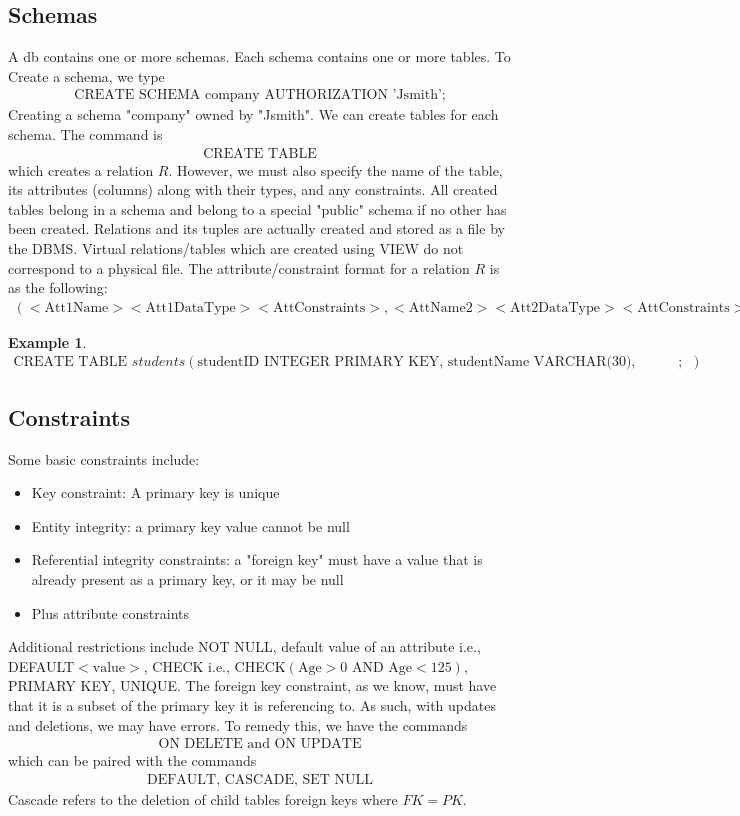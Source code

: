 \documentclass[a4paper]{article}
\theoremstyle{plain}
\theoremstyle{definition}
\newtheorem{exmp}{Example}[section]
\theoremstyle{remark}
\begin{document}
	\subsection{Schemas}
	A db contains one or more schemas. Each schema contains one or more tables. To Create a schema, we type
	\begin{align*}
		\text{CREATE SCHEMA company AUTHORIZATION 'Jsmith';}
	\end{align*}
	Creating a schema "company" owned by "Jsmith".\label{table}
We can create tables for each schema. The command is
\begin{align*}
	\text{CREATE TABLE}
\end{align*}
which creates a relation $R$. However, we must also specify the name of the table, its attributes (columns) along with their types, and any constraints. All created tables belong in a schema and belong to a special "public" schema if no other has been created. Relations and its tuples are actually created and stored as a file by the DBMS. Virtual relations/tables which are created using VIEW do not correspond to a physical file. The attribute/constraint format for a relation $R$ is as the following:
\begin{align*}
	(<\text{Att1Name}><\text{Att1DataType}><\text{AttConstraints}>,<\text{AttName2}><\text{Att2DataType}><\text{AttConstraints}>,\ldots)
\end{align*}
\begin{exmp}
	\begin{align*}
		\text{CREATE TABLE } students(\text{studentID INTEGER PRIMARY KEY, studentName VARCHAR(30), courseID INTEGER});
	\end{align*}

\end{exmp}
\subsection{Constraints}
Some basic constraints include:
\begin{itemize}
	\item Key constraint: A primary key is unique
	\item Entity integrity: a primary key value cannot be null
	\item Referential integrity constraints: a "foreign key" must have a value that is already present as a primary key, or it may be null
	\item Plus attribute constraints
\end{itemize}
Additional restrictions include NOT NULL, default value of an attribute i.e., DEFAULT$<\text{value}>$, CHECK i.e., CHECK$(\text{Age} > 0 \text{ AND Age}<125 )$, PRIMARY KEY, UNIQUE.
The foreign key constraint, as we know, must have that it is a subset of the primary key it is referencing to. As such, with updates and deletions, we may have errors. To remedy this, we have the commands
\begin{align*}
	\text{ON DELETE and ON UPDATE}
\end{align*}
which can be paired with the commands
\begin{align*}
	\text{DEFAULT, CASCADE, SET NULL}
\end{align*}
Cascade refers to the deletion of child tables foreign keys where $FK=PK$.
\end{document}
